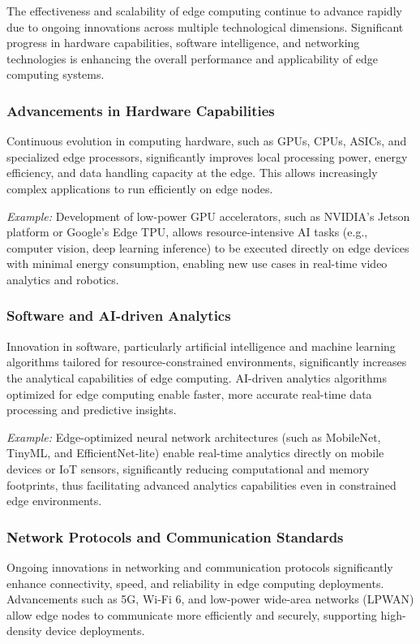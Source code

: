\documentclass[runningheads]{llncs}
\begin{document}
The effectiveness and scalability of edge computing continue to advance rapidly due to ongoing innovations across multiple technological dimensions. Significant progress in hardware capabilities, software intelligence, and networking technologies is enhancing the overall performance and applicability of edge computing systems.

\subsubsection{Advancements in Hardware Capabilities}
Continuous evolution in computing hardware, such as GPUs, CPUs, ASICs, and specialized edge processors, significantly improves local processing power, energy efficiency, and data handling capacity at the edge. This allows increasingly complex applications to run efficiently on edge nodes.

\textit{Example:} Development of low-power GPU accelerators, such as NVIDIA's Jetson platform or Google's Edge TPU, allows resource-intensive AI tasks (e.g., computer vision, deep learning inference) to be executed directly on edge devices with minimal energy consumption, enabling new use cases in real-time video analytics and robotics.

\subsubsection{Software and AI-driven Analytics}
Innovation in software, particularly artificial intelligence and machine learning algorithms tailored for resource-constrained environments, significantly increases the analytical capabilities of edge computing. AI-driven analytics algorithms optimized for edge computing enable faster, more accurate real-time data processing and predictive insights.

\textit{Example:} Edge-optimized neural network architectures (such as MobileNet, TinyML, and EfficientNet-lite) enable real-time analytics directly on mobile devices or IoT sensors, significantly reducing computational and memory footprints, thus facilitating advanced analytics capabilities even in constrained edge environments.

\subsubsection{Network Protocols and Communication Standards}
Ongoing innovations in networking and communication protocols significantly enhance connectivity, speed, and reliability in edge computing deployments. Advancements such as 5G, Wi-Fi 6, and low-power wide-area networks (LPWAN) allow edge nodes to communicate more efficiently and securely, supporting high-density device deployments.
\end{document}
